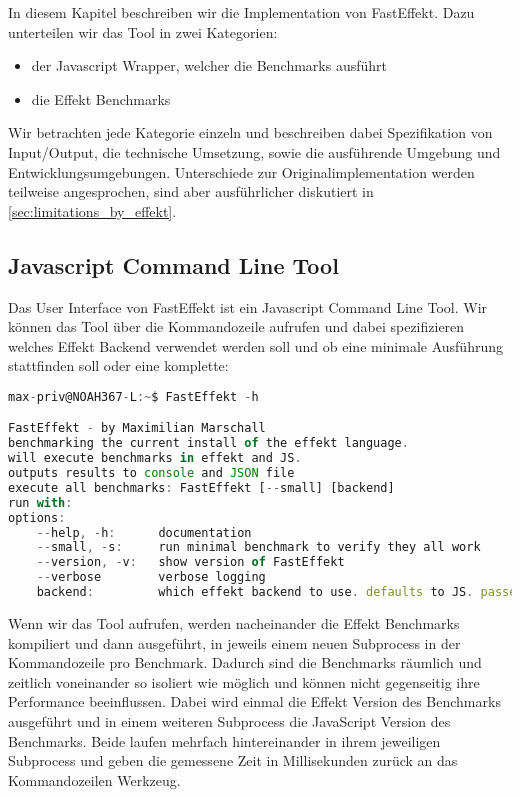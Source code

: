 
In diesem Kapitel beschreiben wir die Implementation von FastEffekt.
Dazu unterteilen wir das Tool in zwei Kategorien:
\begin{itemize}
    \item der Javascript Wrapper, welcher die Benchmarks ausführt
    \item die Effekt Benchmarks
\end{itemize}     
Wir betrachten jede Kategorie einzeln und beschreiben dabei Spezifikation von Input/Output, die technische Umsetzung, sowie die ausführende Umgebung und Entwicklungsumgebungen. Unterschiede zur Originalimplementation werden teilweise angesprochen, sind aber ausführlicher diskutiert in \ref{sec:limitations_by_effekt}.

\subsection{Javascript Command Line Tool}
Das User Interface von FastEffekt ist ein Javascript Command Line Tool.
Wir können das Tool über die Kommandozeile aufrufen und dabei spezifizieren welches Effekt Backend verwendet werden soll und ob eine minimale Ausführung stattfinden soll oder eine komplette:
\begin{lstlisting}[language=JavaScript]
max-priv@NOAH367-L:~$ FastEffekt -h

FastEffekt - by Maximilian Marschall
benchmarking the current install of the effekt language.
will execute benchmarks in effekt and JS.
outputs results to console and JSON file
execute all benchmarks: FastEffekt [--small] [backend]
run with: 
options:
    --help, -h:      documentation
    --small, -s:     run minimal benchmark to verify they all work
    --version, -v:   show version of FastEffekt
    --verbose        verbose logging
    backend:         which effekt backend to use. defaults to JS. passed        directly to effekt.sh
\end{lstlisting}

Wenn wir das Tool aufrufen, werden nacheinander die Effekt Benchmarks kompiliert und dann ausgeführt, in jeweils einem neuen Subprocess in der Kommandozeile pro Benchmark. Dadurch sind die Benchmarks räumlich und zeitlich voneinander so isoliert wie möglich und können nicht gegenseitig ihre Performance beeinflussen.
Dabei wird einmal die Effekt Version des Benchmarks ausgeführt und in einem weiteren Subprocess die JavaScript Version des Benchmarks. Beide laufen mehrfach hintereinander in ihrem jeweiligen Subprocess und geben die gemessene Zeit in Millisekunden zurück an das Kommandozeilen Werkzeug.

